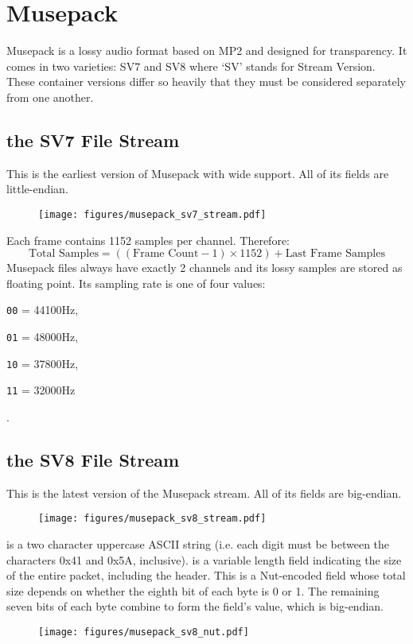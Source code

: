 
\chapter{Musepack}
Musepack is a lossy audio format based on MP2 and designed for
transparency.
It comes in two varieties: SV7 and SV8 where `SV' stands for
Stream Version.
These container versions differ so heavily that they must be
considered separately from one another.
\section{the SV7 File Stream}
This is the earliest version of Musepack with wide support.
All of its fields are little-endian.
\begin{figure}[h]
\texttt{[image: figures/musepack\_sv7\_stream.pdf]}
\end{figure}
Each frame contains 1152 samples per channel.
Therefore:
\begin{equation}
\text{Total Samples} = ((\text{Frame Count} - 1) \times 1152) + \text{Last Frame Samples}
\end{equation}
Musepack files always have exactly 2 channels and its lossy samples
are stored as floating point.
Its sampling rate is one of four values:

\begin{inparaenum}
\item[\texttt{00} = ] 44100Hz,
\item[\texttt{01} = ] 48000Hz,
\item[\texttt{10} = ] 37800Hz,
\item[\texttt{11} = ] 32000Hz
\end{inparaenum}
.

\pagebreak

\section{the SV8 File Stream}
This is the latest version of the Musepack stream.
All of its fields are big-endian.
\begin{figure}[h]
\texttt{[image: figures/musepack\_sv8\_stream.pdf]}
\end{figure}
\par
\noindent
{} is a two character uppercase ASCII string
(i.e. each digit must be between the characters 0x41 and 0x5A, inclusive).
 is a variable length field indicating the size of the entire packet,
including the header.
This is a Nut-encoded field whose total size depends on whether
the eighth bit of each byte is 0 or 1.
The remaining seven bits of each byte combine to form the field's value,
which is big-endian.
\begin{figure}[h]
\texttt{[image: figures/musepack\_sv8\_nut.pdf]}
\end{figure}


